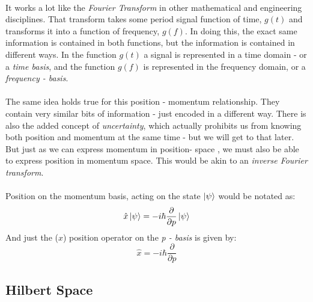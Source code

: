 \documentclass[12pt,letterpaper]{book}
\begin{document}
\paragraph*{}It works a lot like the \textit{Fourier Transform} in other mathematical and engineering disciplines. That transform takes some period signal function of time, $g(t)$ and transforms it into a function of frequency, $g(f)$. In doing this, the exact same information is contained in both functions, but the information is contained in different ways. In the function $g(t)$ a signal is represented in a time domain - or a \textit{time basis}, and the function $g(f)$ is represented in the frequency domain, or a \textit{frequency - basis}.
\paragraph*{}The same idea holds true for this position - momentum relationship. They contain very similar bits of information - just encoded in a different way. There is also the added concept of \textit{uncertainty}, which actually prohibits us from knowing both position and momentum at the same time - but we will get to that later. But just as we can express momentum in position- space , we must also be able to express position in momentum space. This would be akin to an \textit{inverse Fourier transform}.
\paragraph*{}Position on the momentum basis, acting on the state $\ket{\psi}$ would be notated as:
\begin{equation}
\label{position on psi}
\hat{x}\ket{\psi} = -i\hbar\frac{\partial}{\partial p}\ket{\psi}
\end{equation}
And just the ($x$) position operator on the \textit{p - basis} is given by:
\begin{equation}
\label{position}
\hat{x} = -i\hbar\frac{\partial}{\partial p}
\end{equation}


\subsection*{Hilbert Space}
\end{document}
